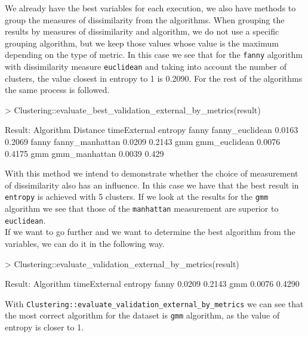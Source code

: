 We already have the best variables for each execution, we also have methods to group the measures of dissimilarity from the algorithms. When grouping the results by measures of dissimilarity and algorithm, we do not use a specific grouping algorithm, but we keep those values whose value is the maximum depending on the type of metric. In this case we see that for the \texttt{fanny} algorithm with dissimilarity measure \texttt{euclidean} and taking into account the number of clusters, the value closest in entropy to 1 is 0.2090. For the rest of the algorithms the same process is followed.

\begin{Schunk}
\begin{Sinput}
> Clustering::evaluate_best_validation_external_by_metrics(result)
\end{Sinput}
\begin{Soutput}
Result:
Algorithm     Distance      timeExternal entropy
 fanny     fanny_euclidean      0.0163   0.2069
 fanny     fanny_manhattan      0.0209   0.2143
  gmm       gmm_euclidean       0.0076   0.4175
  gmm       gmm_manhattan       0.0039   0.429
\end{Soutput}
\end{Schunk}

With this method we intend to demonstrate whether the choice of measurement of dissimilarity also has an influence.
In this case we have that the best result in \texttt{entropy} is achieved with 5 clusters. If we look at the results for the \texttt{gmm} algorithm we see that those of the \texttt{manhattan} measurement are superior to \texttt{euclidean}.
\\
If we want to go further and we want to determine the best algorithm from the variables, we can do it in the following way.

\begin{Schunk}
\begin{Sinput}
> Clustering::evaluate_validation_external_by_metrics(result)
\end{Sinput}
\begin{Soutput}
Result:
  Algorithm timeExternal entropy
    fanny     0.0209     0.2143
    gmm       0.0076     0.4290
\end{Soutput}
\end{Schunk}

With \texttt{Clustering::evaluate\_validation\_external\_by\_metrics} we can see that the most correct algorithm for the dataset is \texttt{gmm} algorithm, as the value of entropy is closer to 1.

